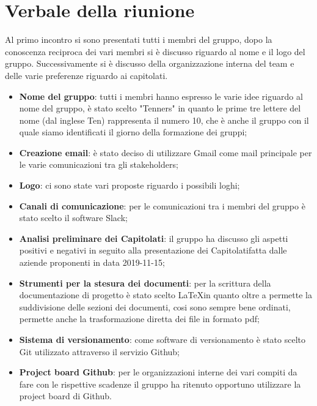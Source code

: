 \section{Verbale della riunione}
		Al primo incontro si sono presentati tutti i membri del gruppo, dopo la conoscenza reciproca dei vari membri si è discusso riguardo al nome e il logo del gruppo. Successivamente si è discusso della organizzazione interna del team e delle varie preferenze riguardo ai capitolati\glos. 
	\begin{itemize}
		\item \textbf {Nome del gruppo}: tutti i membri hanno espresso le varie idee riguardo al nome del gruppo, è stato scelto "Tenners" in quanto le prime tre lettere del nome (dal inglese Ten) rappresenta il numero 10, che è anche il gruppo con il quale siamo identificati il giorno della formazione dei gruppi;
		\item \textbf {Creazione email}: è stato deciso di utilizzare Gmail come mail principale per le varie comunicazioni tra gli stakeholders\glos;
		\item \textbf {Logo}: ci sono state vari proposte riguardo i possibili loghi;
		\item \textbf {Canali di comunicazione}: per le comunicazioni tra i membri del gruppo è stato scelto il software Slack\glos;
		\item \textbf {Analisi preliminare dei Capitolati\glos}: il gruppo ha discusso gli aspetti positivi e negativi in seguito alla presentazione dei Capitolati\glo fatta dalle aziende proponenti in data 2019-11-15;
		\item \textbf {Strumenti per la stesura dei documenti}: per la scrittura della documentazione di progetto è stato scelto \LaTeX  in quanto oltre a permette la suddivisione delle sezioni dei documenti, cosi sono sempre bene ordinati, permette anche la trasformazione diretta dei file in formato pdf;
		\item \textbf {Sistema di versionamento}: come software di versionamento è stato scelto Git utilizzato attraverso il servizio Github;
		\item \textbf {Project board Github}: per le organizzazioni interne dei vari compiti da fare con le rispettive scadenze il gruppo ha ritenuto opportuno utilizzare la project board di Github.
	\end{itemize}

